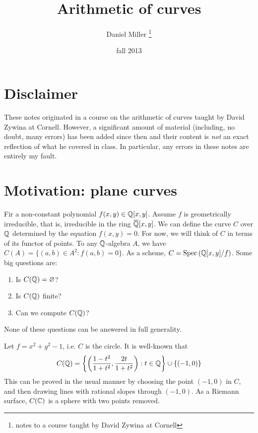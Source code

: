 \documentclass{article}
\title{Arithmetic of curves}
\author{Daniel Miller
  \thanks{notes to a course taught by David Zywina at Cornell}}
\date{fall 2013}
\begin{document}
\maketitle
\tableofcontents










\section*{Disclaimer}

These notes originated in a course on the arithmetic of curves taught by David 
Zywina at Cornell. However, a significant amount of material (including, no 
doubt, many errors) has been added since then and their content is \emph{not} 
an exact reflection of what he covered in class. In particular, any errors in 
these notes are entirely my fault. 










\section{Motivation: plane curves}

Fir a non-constant polynomial $f(x,y)\in\mathbb{Q}[x,y]$. Assume $f$ is 
geometrically irreducible, that is, irreducible in the ring 
$\overline{\mathbb{Q}}[x,y]$. We can define the curve $C$ over $\mathbb{Q}$ determined by the 
equation $f(x,y)=0$. For now, we will think of $C$ in terms of its functor of 
points. To any $\mathbb{Q}$-algebra $A$, we have $C(A)=\{(a,b)\in A^2:f(a,b)=0\}$. 
As a scheme, $C=\operatorname{Spec}\left(\mathbb{Q}[x,y]/f\right)$. Some big questions are:
\begin{enumerate}
  \item Is $C(\mathbb{Q})=\varnothing$?
  \item Is $C(\mathbb{Q})$ finite?
  \item Can we compute $C(\mathbb{Q})$?
\end{enumerate}
None of these questions can be answered in full generality. 

\begin{example}
Let $f=x^2+y^2-1$, i.e. $C$ is the circle. It is well-known that 
\[
  C(\mathbb{Q})=\left\{\left(\frac{1-t^2}{1+t^2},\frac{2t}{1+t^2}\right):t\in\mathbb{Q}\right\}\cup \{(-1,0)\}
\]
This can be proved in the usual manner by choosing the point $(-1,0)$ in $C$, 
and then drawing lines with rational slopes through $(-1,0)$. As a Riemann 
surface, $C(\mathbb{C})$ is a sphere with two points removed. 
\end{example}
\end{document}
